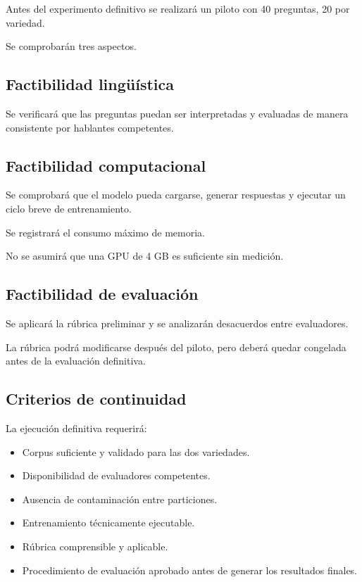 Antes del experimento definitivo se realizará un piloto con 40 preguntas, 20 por variedad.

Se comprobarán tres aspectos.

\subsection{Factibilidad lingüística}\label{factibilidad-linguxfcuxedstica}

Se verificará que las preguntas puedan ser interpretadas y evaluadas de manera consistente por hablantes competentes.

\subsection{Factibilidad computacional}\label{factibilidad-computacional}

Se comprobará que el modelo pueda cargarse, generar respuestas y ejecutar un ciclo breve de entrenamiento.

Se registrará el consumo máximo de memoria.

No se asumirá que una GPU de 4 GB es suficiente sin medición.

\subsection{Factibilidad de evaluación}\label{factibilidad-de-evaluaciuxf3n}

Se aplicará la rúbrica preliminar y se analizarán desacuerdos entre evaluadores.

La rúbrica podrá modificarse después del piloto, pero deberá quedar congelada antes de la evaluación definitiva.

\subsection{Criterios de continuidad}\label{criterios-de-continuidad}

La ejecución definitiva requerirá:

\begin{itemize}
\tightlist
\item
  Corpus suficiente y validado para las dos variedades.
\item
  Disponibilidad de evaluadores competentes.
\item
  Ausencia de contaminación entre particiones.
\item
  Entrenamiento técnicamente ejecutable.
\item
  Rúbrica comprensible y aplicable.
\item
  Procedimiento de evaluación aprobado antes de generar los resultados finales.
\end{itemize}

